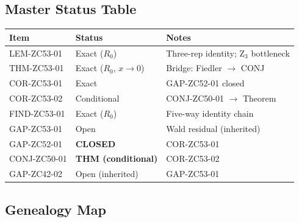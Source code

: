 \documentclass[12pt, a4paper]{article}
\begin{document}
\subsection{Master Status Table}

\begin{center}
\begin{tabular}{@{}lp{4cm}p{5cm}@{}}
\toprule
\textbf{Item} & \textbf{Status} & \textbf{Notes} \\
\midrule
LEM-ZC53-01 & Exact ($R_0$) & Three-rep identity; Z$_3$ bottleneck \\
THM-ZC53-01 & Exact ($R_0$, $x\to 0$) & Bridge: Fiedler $\to$ CONJ \\
COR-ZC53-01 & Exact & GAP-ZC52-01 closed \\
COR-ZC53-02 & Conditional & CONJ-ZC50-01 $\to$ Theorem \\
FIND-ZC53-01 & Exact ($R_0$) & Five-way identity chain \\
GAP-ZC53-01 & Open & Wald residual (inherited) \\
\midrule
GAP-ZC52-01 & \textbf{CLOSED} & COR-ZC53-01 \\
CONJ-ZC50-01 & \textbf{THM (conditional)} & COR-ZC53-02 \\
GAP-ZC42-02 & Open (inherited) & GAP-ZC53-01 \\
\bottomrule
\end{tabular}
\end{center}

\subsection{Genealogy Map}
\end{document}

